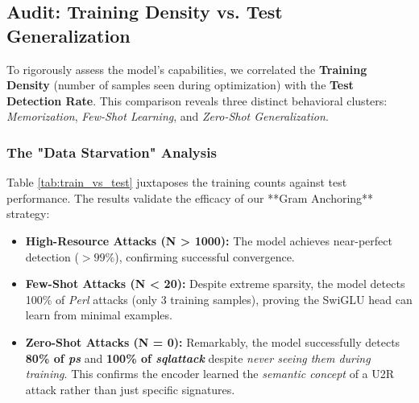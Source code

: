\documentclass[
  10pt,
  twocolumn,
  a4paper,
  parskip=half
]{scrartcl}
\begin{document}
    \subsection{Audit: Training Density vs. Test Generalization}
    To rigorously assess the model's capabilities, we correlated the \textbf{Training Density} (number of samples seen during optimization) with the \textbf{Test Detection Rate}. This comparison reveals three distinct behavioral clusters: \textit{Memorization}, \textit{Few-Shot Learning}, and \textit{Zero-Shot Generalization}.

    \subsubsection{The "Data Starvation" Analysis}
    Table \ref{tab:train_vs_test} juxtaposes the training counts against test performance. The results validate the efficacy of our **Gram Anchoring** strategy:
    \begin{itemize}
        \item \textbf{High-Resource Attacks (N > 1000):} The model achieves near-perfect detection ($>99\%$), confirming successful convergence.
        \item \textbf{Few-Shot Attacks (N < 20):} Despite extreme sparsity, the model detects 100\% of \textit{Perl} attacks (only 3 training samples), proving the SwiGLU head can learn from minimal examples.
        \item \textbf{Zero-Shot Attacks (N = 0):} Remarkably, the model successfully detects \textbf{80\% of \textit{ps}} and \textbf{100\% of \textit{sqlattack}} despite \textit{never seeing them during training}. This confirms the encoder learned the \textit{semantic concept} of a U2R attack rather than just specific signatures.
    \end{itemize}
\end{document}
